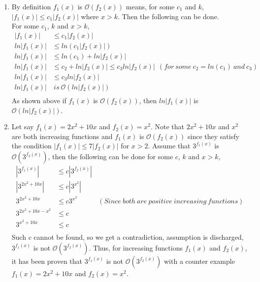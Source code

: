 \documentclass[12pt]{article}
\begin{document}
\renewcommand{\theenumi}{\alph{enumi}}
\begin{enumerate}
    \item By definition $f_1(x)$ is $\mathcal{O}(f_2(x))$ means, for some $c_1$ and $k$, $|f_1(x)| \leq c_1|f_2(x)|$ where $x > k$. Then the following can be done.\\
    For some $c_1$, $k$ and $x > k$,
    \begin{equation}
        \begin{split}
            |f_1(x)| & \leq c_1 |f_2(x)| \\
            ln|f_1(x)| & \leq ln(c_1 |f_2(x)|) \\
            ln|f_1(x)| & \leq ln(c_1) + ln|f_2(x)|\\
            ln|f_1(x)| & \leq c_2 + ln|f_2(x)| \leq c_3ln|f_2(x)| \ \ (for \ some \ c_2 = ln(c_1) \ and \ c_3)\\
            ln|f_1(x)| & \leq c_3ln|f_2(x)|\\
            ln|f_1(x)| & \ is \ \mathcal{O}(ln|f_2(x)|) \\
        \end{split}
    \end{equation}
    As shown above if $f_1(x)$ is $\mathcal{O}(f_2(x))$, then $ln|f_1(x)|$ is $\mathcal{O}(ln|f_2(x)|)$.
    
     \item Let say $f_1(x) = 2x^2 + 10x$ and $f_2(x) = x^2$. Note that $2x^2 + 10x$ and $x^2$ are both increasing functions and $f_1(x)$ is $\mathcal{O}(f_2(x))$ since they satisfy the condition $|f_1(x)| \leq 7|f_2(x)|$ for $x > 2$. Assume that $3^{f_1(x)}$ is $\mathcal{O}(3^{f_2(x)})$, then the following can be done for some $c$, $k$ and $x > k$,
     \begin{equation}
         \begin{split}
            |3^{f_1(x)}| & \leq c |3^{f_2(x)}| \\
            |3^{2x^2 + 10x}| & \leq c |3^{x^2}| \\
            3^{2x^2 + 10x} & \leq c 3^{x^2} \qquad \quad (Since \ both \ are \ positive \ increasing \ functions)\\
            3^{2x^2 + 10x - x^2} & \leq c \\
            3^{x^2 + 10x} & \leq c \\
         \end{split}
     \end{equation}
     Such $c$ cannot be found, so we get a contradiction, assumption is discharged, $3^{f_1(x)}$ is not $\mathcal{O}(3^{f_2(x)})$. Thus, for increasing functions $f_1(x)$ and $f_2(x)$, it has been proven that $3^{f_1(x)}$ is not $\mathcal{O}(3^{f_2(x)})$ with a counter example $f_1(x) = 2x^2 + 10x$ and $f_2(x) = x^2$.
\end{enumerate}
\end{document}
